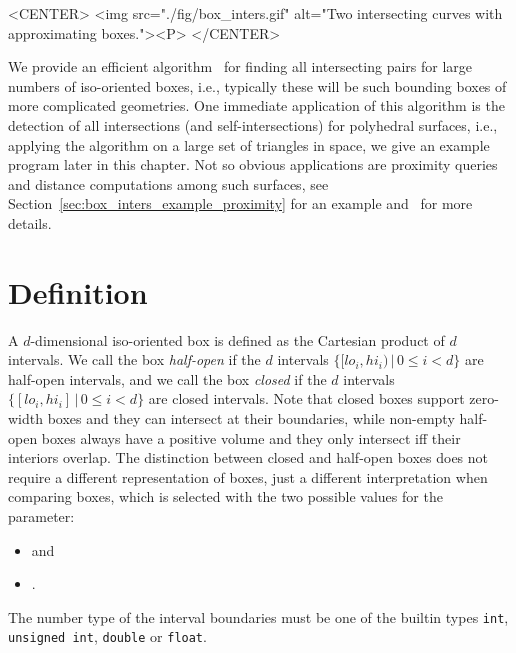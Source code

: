 \begin{ccHtmlOnly}
    <CENTER>
        <img src="./fig/box_inters.gif" alt="Two intersecting curves with
        approximating boxes."><P>
    </CENTER>
\end{ccHtmlOnly}

We provide an efficient algorithm~\cite{cgal:ze-fsbi-02} for finding all
intersecting pairs for large numbers of iso-oriented boxes, i.e.,
typically these will be such bounding boxes of more complicated geometries.
One immediate application of this algorithm is the detection of all
intersections (and self-intersections) for polyhedral surfaces, i.e.,
applying the algorithm on a large set of triangles in space, we give
an example program later in this chapter. Not so obvious applications
are proximity queries and distance computations among such surfaces,
see Section~\ref{sec:box_inters_example_proximity} for an example
and~\cite{cgal:ze-fsbi-02} for more details.  

\section{Definition}\label{sec:box-inters-def}

A $d$-dimensional iso-oriented box is defined as the Cartesian product
of $d$ intervals. We call the box \emph{half-open} if the $d$
intervals $\{ [lo_i,hi_i) \,|\, 0 \leq i < d\}$ are half-open intervals,
and we call the box \emph{closed} if the $d$ intervals $\{ [lo_i,hi_i]
\,|\, 0 \leq i < d\}$ are closed intervals. Note that closed boxes support
zero-width boxes and they can intersect at their boundaries, while
non-empty half-open boxes always have a positive volume and they only
intersect iff their interiors overlap.  The distinction between closed
and half-open boxes does not require a different representation of
boxes, just a different interpretation when comparing boxes, which is
selected with the two possible values for the  parameter:

\begin{itemize}
  \item {} and
  \item {}.
\end{itemize}

The number type of the interval boundaries must be one of the builtin
types \texttt{int}, \texttt{unsigned int}, \texttt{double} or
\texttt{float}.

